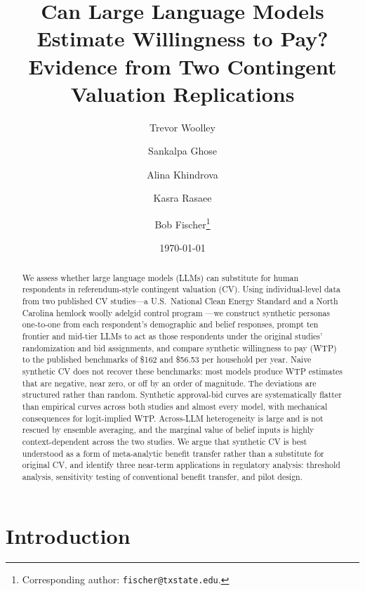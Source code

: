 \documentclass[12pt]{article}
\title{Can Large Language Models Estimate Willingness to Pay? \\ Evidence from Two Contingent Valuation Replications}
\date{\today}
\author[1]{Trevor Woolley}
\author[2]{Sankalpa Ghose}
\author[3]{Alina Khindrova}
\author[4]{Kasra Rasaee}
\author[5]{Bob Fischer\thanks{Corresponding author: \texttt{fischer@txstate.edu}.}}
\affil[1]{University of California, Berkeley}
\affil[2]{National University of Singapore}
\affil[3]{University of Texas at San Antonio}
\affil[4]{Bloomberg}
\affil[5]{Texas State University}
\begin{document}
\maketitle


\footnotesize
\begin{abstract}
We assess whether large language models (LLMs) can substitute for human
respondents in referendum-style contingent valuation (CV). Using
individual-level data from two published CV studies---a U.S.\ National
Clean Energy Standard \parencite{Aldy2012} and a North Carolina hemlock
woolly adelgid control program \parencite{Giguere2020}---we construct
synthetic personas one-to-one from each respondent's demographic and
belief responses, prompt ten frontier and mid-tier LLMs to act as those
respondents under the original studies' randomization and bid
assignments, and compare synthetic willingness to pay (WTP) to the
published benchmarks of \$162 and \$56.53 per household per year. Naive
synthetic CV does not recover these benchmarks: most models produce WTP
estimates that are negative, near zero, or off by an order of magnitude.
The deviations are structured rather than random. Synthetic approval-bid
curves are systematically flatter than empirical curves across both
studies and almost every model, with mechanical consequences for
logit-implied WTP. Across-LLM heterogeneity is large and is not rescued
by ensemble averaging, and the marginal value of belief inputs is
highly context-dependent across the two studies. We argue that synthetic
CV is best understood as a form of meta-analytic benefit transfer rather
than a substitute for original CV, and identify three near-term
applications in regulatory analysis: threshold analysis, sensitivity
testing of conventional benefit transfer, and pilot design.
\end{abstract}

\newpage

%

\section{Introduction}\label{sec:intro}
\end{document}
